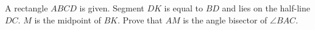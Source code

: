 A rectangle $ABCD$ is given. Segment $DK$ is equal to $BD$ and lies on the half-line $DC$. $M$ is the midpoint of $BK$. Prove that $AM$ is the angle bisector of $\angle BAC$.